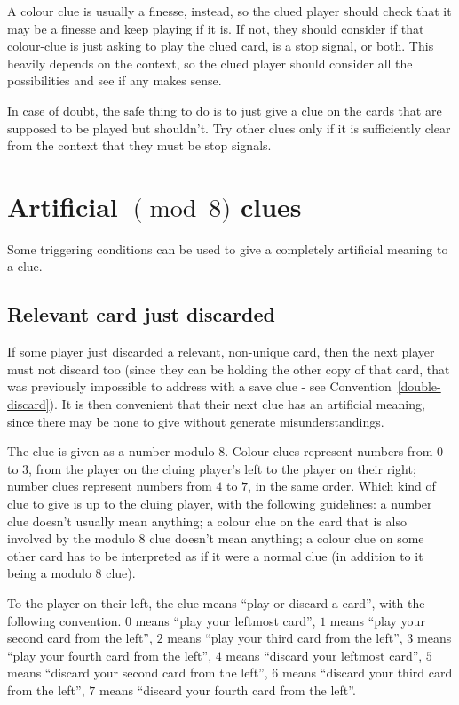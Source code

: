 \documentclass[a4paper]{article}
\theoremstyle{plain}
\theoremstyle{definition}
\begin{document}
A colour clue is usually a finesse, instead, so the clued player should check that it may be a finesse and keep playing if it is. If not, they should consider if that colour-clue is just asking to play the clued card, is a stop signal, or both. This heavily depends on the context, so the clued player should consider all the possibilities and see if any makes sense.

In case of doubt, the safe thing to do is to just give a clue on the cards that are supposed to be played but shouldn't. Try other clues only if it is sufficiently clear from the context that they must be stop signals.

\section{Artificial $\pmod 8$ clues}
\label{sec:mod8}

Some triggering conditions can be used to give a completely artificial meaning to a clue.

\subsection{Relevant card just discarded}

If some player just discarded a relevant, non-unique card, then the next player must not discard too (since they can be holding the other copy of that card, that was previously impossible to address with a save clue - see Convention~\ref{double-discard}). It is then convenient that their next clue has an artificial meaning, since there may be none to give without generate misunderstandings.

The clue is given as a number modulo 8. Colour clues represent numbers from $0$ to $3$, from the player on the cluing player's left to the player on their right; number clues represent numbers from $4$ to $7$, in the same order. Which kind of clue to give is up to the cluing player, with the following guidelines: a number clue doesn't usually mean anything; a colour clue on the card that is also involved by the modulo 8 clue doesn't mean anything; a colour clue on some other card has to be interpreted as if it were a normal clue (in addition to it being a modulo 8 clue).

To the player on their left, the clue means ``play or discard a card'', with the following convention. $0$ means ``play your leftmost card'', $1$ means ``play your second card from the left'', $2$ means ``play your third card from the left'', $3$ means ``play your fourth card from the left'', $4$ means ``discard your leftmost card'', $5$ means ``discard your second card from the left'', $6$ means ``discard your third card from the left'', $7$ means ``discard your fourth card from the left''.
\end{document}

